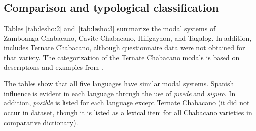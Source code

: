 \documentclass[output=paper,colorlinks,citecolor=brown]{langscibook}
\begin{document}
\subsection{Comparison and typological classification}

Tables \ref{tab:lesho:2} and~\ref{tab:lesho:3} summarize the modal systems of Zamboanga Chabacano, Cavite Chabacano, Hiligaynon, and Tagalog. In addition,  includes Ternate Chabacano, although questionnaire data were not obtained for that variety. The categorization of the Ternate Chabacano modals is based on descriptions and examples from \citet[156--166, 208--210]{Sippola2011}.

The tables show that all five languages have similar modal systems. Spanish influence is evident in each language through the use of \textit{pwede} and \textit{siguro}. In addition, \textit{posible} is listed for each language except Ternate Chabacano (it did not occur in  dataset, though it is listed as a lexical item for all Chabacano varieties in  comparative dictionary).
\end{document}
